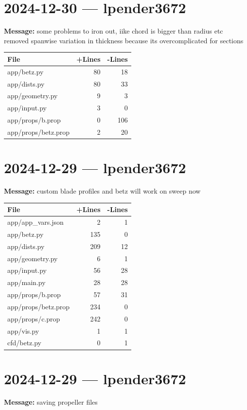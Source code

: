 \documentclass{article}
\begin{document}
\section*{2024-12-30 --- lpender3672}
\textbf{Message:} some problems to iron out, iike chord is bigger than radius etc removed spanwise variation in thickness because its overcomplicated for sections

\begin{longtable}{|p{10cm}|r|r|}
\hline \textbf{File} & \textbf{+Lines} & \textbf{-Lines} \\
\hline
app/betz.py & 80 & 18 \\
\hline
app/dists.py & 80 & 33 \\
\hline
app/geometry.py & 9 & 3 \\
\hline
app/input.py & 3 & 0 \\
\hline
app/props/b.prop & 0 & 106 \\
\hline
app/props/betz.prop & 2 & 20 \\
\hline
\end{longtable}

\section*{2024-12-29 --- lpender3672}
\textbf{Message:} custom blade profiles and betz will work on sweep now

\begin{longtable}{|p{10cm}|r|r|}
\hline \textbf{File} & \textbf{+Lines} & \textbf{-Lines} \\
\hline
app/app\_vars.json & 2 & 1 \\
\hline
app/betz.py & 135 & 0 \\
\hline
app/dists.py & 209 & 12 \\
\hline
app/geometry.py & 6 & 1 \\
\hline
app/input.py & 56 & 28 \\
\hline
app/main.py & 28 & 28 \\
\hline
app/props/b.prop & 57 & 31 \\
\hline
app/props/betz.prop & 234 & 0 \\
\hline
app/props/c.prop & 242 & 0 \\
\hline
app/vis.py & 1 & 1 \\
\hline
cfd/betz.py & 0 & 1 \\
\hline
\end{longtable}

\section*{2024-12-29 --- lpender3672}
\textbf{Message:} saving propeller files
\end{document}
